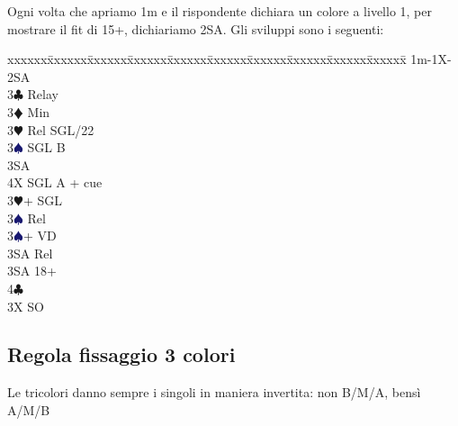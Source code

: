 \documentclass[a4paper,italian]{article}
\newcommand{\BC}{\textcolor{OliveGreen}{$\clubsuit$}}
\newcommand{\BD}{\textcolor{RedOrange}{$\vardiamondsuit$}}
\newcommand{\BH}{\textcolor{Red2}{$\varheartsuit${}}}
\newcommand{\BS}{\textcolor{MidnightBlue}{$\spadesuit${}}}
\newenvironment{bidtable}
{\begin{tabbing}

    xxxxxx\=xxxxxx\=xxxxxx\=xxxxxx\=xxxxxx\=xxxxxx\=xxxxxx\=xxxxxx\=xxxxxx\=xxxxxx\=\kill}
{\end{tabbing} }%
\newenvironment{attenzione}[1]
{\begin{tcolorbox}[colframe=red!80!white,title=#1]}
    {
\end{tcolorbox} }%
\begin{document}
                                Ogni volta che apriamo 1m e il rispondente dichiara un colore a livello 1, per mostrare il fit di 15+, dichiariamo 2SA. Gli sviluppi sono i seguenti:
                                \bigbreak
                                \begin{bidtable}
                                    1m-1X-2SA\+\\
                                    3\BC \> Relay\+\\
                                    3\BD \> Min\+\\
                                    3\BH \> Rel SGL/22\+\\
                                    3\BS \> SGL B\\
                                    3SA \\
                                    4X \> SGL A + cue\-\-\\
                                    3\BH {}+ SGL\+\\
                                    3\BS \> Rel\-\\
                                    3\BS {}+ VD\+\\
                                    3SA \> Rel\-\\
                                    3SA  18+\\
                                    4\BC {}\-\\
                                    3X \> SO\-
                                \end{bidtable}
                                \subsection{Regola fissaggio 3 colori}\label{fissaggi}
                                \begin{attenzione}{Regola generale per le tricolori}
                                    Le tricolori danno sempre i singoli in maniera invertita: non B/M/A, bensì A/M/B
                                \end{attenzione}
\end{document}
